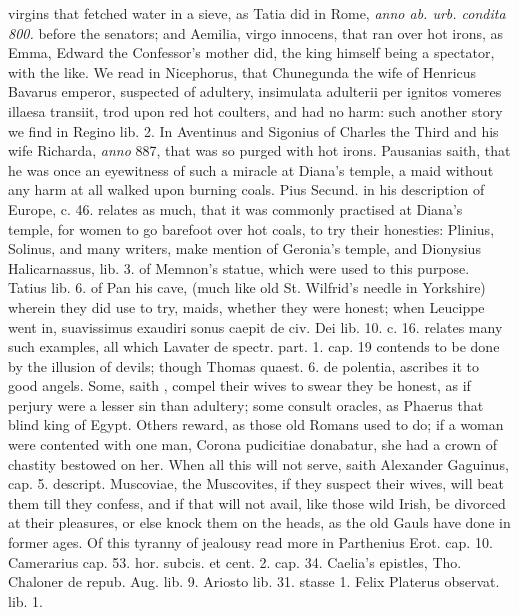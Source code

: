 virgins that fetched water in a sieve, as Tatia did in Rome, \emph{anno ab.
urb. condita 800.} before the senators; and Aemilia, virgo
innocens, that ran over hot irons, as Emma, Edward the Confessor's
mother did, the king himself being a spectator, with the like. We read
in Nicephorus, that Chunegunda the wife of Henricus Bavarus emperor,
suspected of adultery, insimulata adulterii per ignitos vomeres illaesa
transiit, trod upon red hot coulters, and had no harm: such another
story we find in Regino lib. 2. In Aventinus and Sigonius of Charles
the Third and his wife Richarda, \emph{anno} 887, that was so purged with hot
irons. Pausanias saith, that he was once an eyewitness of such a
miracle at Diana's temple, a maid without any harm at all walked upon
burning coals. Pius Secund. in his description of Europe, c. 46.
relates as much, that it was commonly practised at Diana's temple, for
women to go barefoot over hot coals, to try their honesties: Plinius,
Solinus, and many writers, make mention of Geronia's temple, and
Dionysius Halicarnassus, lib. 3. of Memnon's statue, which were used to
this purpose. Tatius lib. 6. of Pan his cave, (much like old St.
Wilfrid's needle in Yorkshire) wherein they did use to try, maids,
whether they were honest; when Leucippe went in, suavissimus
exaudiri sonus caepit \Austin{} de civ. Dei lib. 10. c. 16. relates many
such examples, all which Lavater de spectr. part. 1. cap. 19 contends
to be done by the illusion of devils; though Thomas quaest. 6. de
polentia, \etc{} ascribes it to good angels. Some, saith \Austin{},
compel their wives to swear they be honest, as if perjury were a lesser
sin than adultery; some consult oracles, as Phaerus that blind
king of Egypt. Others reward, as those old Romans used to do; if a
woman were contented with one man, Corona pudicitiae donabatur, she had
a crown of chastity bestowed on her. When all this will not serve,
saith Alexander Gaguinus, cap. 5. descript. Muscoviae, the Muscovites,
if they suspect their wives, will beat them till they confess, and if
that will not avail, like those wild Irish, be divorced at their
pleasures, or else knock them on the heads, as the old Gauls have
done in former ages. Of this tyranny of jealousy read more in
Parthenius Erot. cap. 10. Camerarius cap. 53. hor. subcis. et cent. 2.
cap. 34. Caelia's epistles, Tho. Chaloner de repub. Aug. lib. 9.
Ariosto lib. 31. stasse 1. Felix Platerus observat. lib. 1. \etc{}

